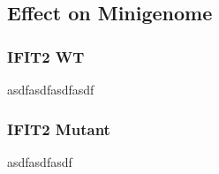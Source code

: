 \subsection{Effect on Minigenome}
\subsubsection{IFIT2 WT}
asdfasdfasdfasdf

\subsubsection{IFIT2 Mutant}
asdfasdfasdf
